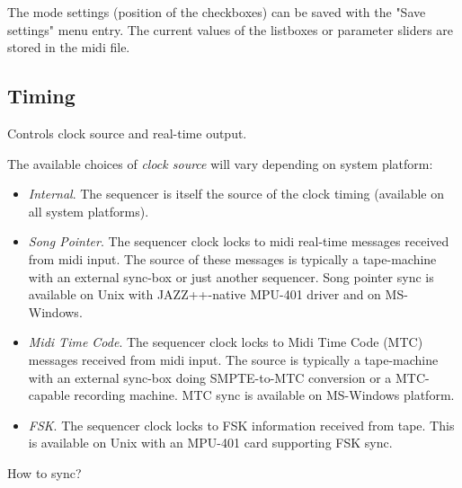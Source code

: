 \documentclass[letterpaper]{report}
\begin{document}
The mode settings (position of the checkboxes) can be saved with the
"Save settings" menu entry. The current values of the listboxes or parameter
sliders are stored in the midi file.

\subsection{Timing}

Controls clock source and real-time output.

The available choices of {\em clock source} will vary depending on system
platform:

\begin{itemize}

\item {\em Internal}. The sequencer is itself the source of the clock timing
(available on all system platforms).

\item {\em Song Pointer}. The sequencer clock locks to midi real-time messages
received from midi input. The source of these messages is typically a
tape-machine with an external sync-box or just another sequencer. Song
pointer sync is available on Unix with JAZZ++-native MPU-401 driver and on
MS-Windows.

\item {\em Midi Time Code}. The sequencer clock locks to Midi Time Code
(MTC) messages received from midi input. The source is typically a
tape-machine with an external sync-box doing SMPTE-to-MTC conversion or
a MTC-capable recording machine. MTC sync is available on MS-Windows platform.

\item {\em FSK}. The sequencer clock locks to FSK information received from
tape. This is available on Unix with an MPU-401 card supporting FSK
sync.

\end{itemize}

How to sync?
\end{document}
